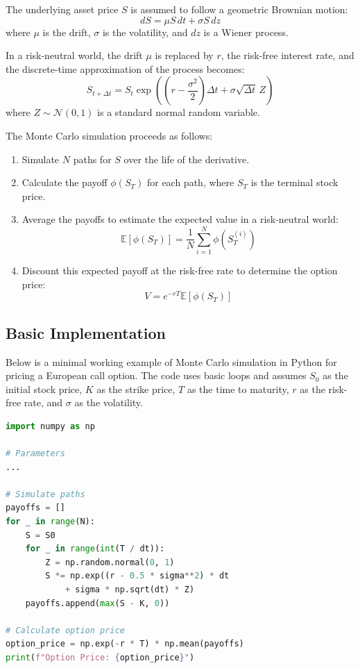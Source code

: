 \documentclass[12pt,a4paper]{report}
\begin{document}
The underlying asset price \( S \) is assumed to follow a geometric Brownian motion:
\[
dS = \mu S \, dt + \sigma S \, dz
\]
where \( \mu \) is the drift, \( \sigma \) is the volatility, and \( dz \) is a Wiener process.

In a risk-neutral world, the drift \( \mu \) is replaced by \( r \), the risk-free interest rate, and the discrete-time approximation of the process becomes:
\[
S_{t+\Delta t} = S_t \exp \left( \left( r - \frac{\sigma^2}{2} \right) \Delta t + \sigma \sqrt{\Delta t} \, Z \right)
\]
where \( Z \sim \mathcal{N}(0, 1) \) is a standard normal random variable.

The Monte Carlo simulation proceeds as follows:
\begin{enumerate}
    \item Simulate \( N \) paths for \( S \) over the life of the derivative.
    \item Calculate the payoff \( \phi(S_T) \) for each path, where \( S_T \) is the terminal stock price.
    \item Average the payoffs to estimate the expected value in a risk-neutral world:
    \[
    \mathbb{E}[ \phi(S_T) ] = \frac{1}{N} \sum_{i=1}^N \phi(S_T^{(i)})
    \]
    \item Discount this expected payoff at the risk-free rate to determine the option price:
    \[
    V = e^{-rT} \mathbb{E}[ \phi(S_T) ]
    \]
\end{enumerate}

\subsection{Basic Implementation}
Below is a minimal working example of Monte Carlo simulation in Python for pricing a European call option. The code uses basic loops and assumes \( S_0 \) as the initial stock price, \( K \) as the strike price, \( T \) as the time to maturity, \( r \) as the risk-free rate, and \( \sigma \) as the volatility.

\begin{tcolorbox}[colback=green!5!white, colframe=green!75!black, title=Optimized Monte Carlo Simulation]
\begin{lstlisting}[language=Python]
import numpy as np

# Parameters
...

# Simulate paths
payoffs = []
for _ in range(N):
    S = S0
    for _ in range(int(T / dt)):
        Z = np.random.normal(0, 1)
        S *= np.exp((r - 0.5 * sigma**2) * dt 
            + sigma * np.sqrt(dt) * Z)
    payoffs.append(max(S - K, 0))

# Calculate option price
option_price = np.exp(-r * T) * np.mean(payoffs)
print(f"Option Price: {option_price}")
\end{lstlisting}
\end{tcolorbox}
\end{document}
